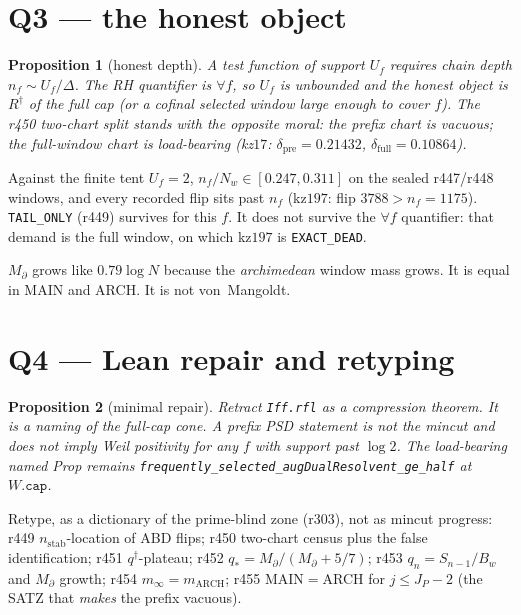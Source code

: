 \documentclass[11pt]{article}
\newtheorem{prop}{Proposition}
\theoremstyle{remark}
\newcommand{\nstab}{n_{\mathrm{stab}}}
\newcommand{\nf}{n_f}
\begin{document}
\section{Q3 --- the honest object}\label{sec:q3}

\begin{prop}[honest depth]\label{prop:honest}
A test function of support $U_f$ requires chain
depth $\nf\sim U_f/\Delta$.
The RH quantifier is $\forall f$, so $U_f$ is
unbounded and the honest object is $R^{\dagger}$
of the full cap (or a cofinal selected window
large enough to cover $f$).
The r450 two-chart split stands with the
opposite moral: the prefix chart is vacuous;
the full-window chart is load-bearing
(kz$17$: $\delta_{\mathrm{pre}}=0.21432$,
$\delta_{\mathrm{full}}=0.10864$).
\end{prop}

Against the finite tent $U_f=2$,
$\nf/N_w\in[0.247,0.311]$ on the sealed
r447/r448 windows, and every recorded flip
sits past $\nf$ (kz$197$: flip $3788>\nf=1175$).
\texttt{TAIL\_ONLY} (r449) survives for this $f$.
It does not survive the $\forall f$ quantifier:
that demand is the full window, on which
kz$197$ is \texttt{EXACT\_DEAD}.

$M_{\partial}$ grows like $0.79\log N$ because
the \emph{archimedean} window mass grows.
It is equal in MAIN and ARCH.  It is not
von~Mangoldt.

\section{Q4 --- Lean repair and retyping}\label{sec:q4}

\begin{prop}[minimal repair]\label{prop:fix}
Retract \texttt{Iff.rfl} as a compression
theorem.  It is a naming of the full-cap cone.
A prefix PSD statement is not the mincut and
does not imply Weil positivity for any $f$
with support past $\log 2$.
The load-bearing named Prop remains
\texttt{frequently\_selected\_augDualResolvent\_ge\_half}
at $W.\mathtt{cap}$.
\end{prop}

Retype, as a dictionary of the prime-blind
zone (r303), not as mincut progress:
r449 $\nstab$-location of ABD flips;
r450 two-chart census plus the false
identification; r451 $q^{\dagger}$-plateau;
r452 $q_*=M_{\partial}/(M_{\partial}+5/7)$;
r453 $q_n=S_{n-1}/B_w$ and $M_{\partial}$ growth;
r454 $m_{\infty}=m_{\mathrm{ARCH}}$;
r455 MAIN$=$ARCH for $j\le J_P-2$
(the SATZ that \emph{makes} the prefix vacuous).
\end{document}
